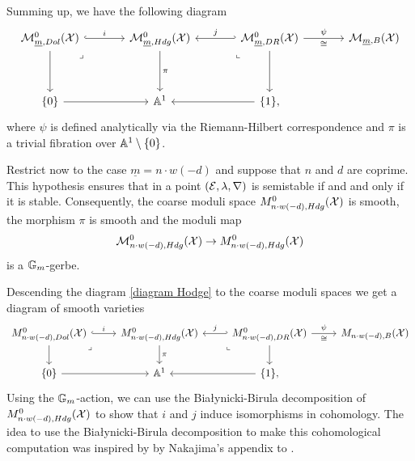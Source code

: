 \documentclass{article}
\begin{document}
Summing up, we have the following diagram
\begin{equation} \label{diagram Hodge}
    \begin{tikzcd}[ampersand replacement=\&, column sep=large, row sep=huge]
        {\mc{M}_{\underline{m}, Dol}^0(\XX)} \& {\mc{M}_{\underline{m},Hdg}^0(\XX)} \& {\mc{M}_{\underline{m}, DR}^0(\XX)} \& {\mc{M}_{\underline{m},B}(\XX)} \\
        {\{ 0 \}} \& {\Ab^1} \& {\{ 1 \},}
        \arrow["i", hook, from=1-1, to=1-2]
        \arrow[from=1-1, to=2-1]
        \arrow["\lrcorner"{anchor=center, pos=0.125}, draw=none, from=1-1, to=2-2]
        \arrow["\pi", from=1-2, to=2-2]
        \arrow["j"', hook', from=1-3, to=1-2]
        \arrow["\psi", "\cong"', from=1-3, to=1-4]
        \arrow["\lrcorner"{anchor=center, pos=0.125, rotate=-90}, draw=none, from=1-3, to=2-2]
        \arrow[from=1-3, to=2-3]
        \arrow[from=2-1, to=2-2]
        \arrow[from=2-3, to=2-2]
    \end{tikzcd}
\end{equation}
where $\psi$ is defined analytically via the Riemann-Hilbert correspondence and $\pi$ is a trivial fibration over $\mathbb{A}^1 \setminus \{0\}$.

Restrict now to the case $\underline{m} = n \cdot w(-d)$ and suppose that $n$ and $d$ are coprime. This hypothesis ensures that in a point $(\mathcal{E}, \lambda, \nabla)$ is semistable if and and only if it is stable. Consequently, the coarse moduli space $M_{n \cdot w(-d), Hdg}^0(\mathcal{X})$ is smooth, the morphism $\pi$ is smooth and the moduli map
\begin{equation}
\mathcal{M}_{n \cdot w(-d), Hdg}^0(\mathcal{X}) \to M_{n \cdot w(-d), Hdg}^0(\mathcal{X})
\end{equation}
is a $\mathbb{G}_m$-gerbe.

Descending the diagram \eqref{diagram Hodge} to the coarse moduli spaces we get a diagram of smooth varieties
\begin{equation}
\begin{tikzcd}
	{M_{n \cdot w(-d), Dol}^0(\XX)} & {M_{n \cdot w(-d), Hdg}^{0}(\XX)} & {M_{n \cdot w(-d), DR}^0(\XX)} & {M_{n \cdot w(-d), B}(\XX)} \\
	{\{ 0 \}} & {\Ab^1} & {\{ 1 \},}
	\arrow["i", hook, from=1-1, to=1-2]
	\arrow[from=1-1, to=2-1]
	\arrow["\lrcorner"{anchor=center, pos=0.125}, draw=none, from=1-1, to=2-2]
	\arrow["\pi", from=1-2, to=2-2]
	\arrow["j"', hook', from=1-3, to=1-2]
	\arrow["\psi", "\cong"', from=1-3, to=1-4]
	\arrow["\lrcorner"{anchor=center, pos=0.125, rotate=-90}, draw=none, from=1-3, to=2-2]
	\arrow[from=1-3, to=2-3]
	\arrow[from=2-1, to=2-2]
	\arrow[from=2-3, to=2-2]
\end{tikzcd}
\end{equation}
Using the $\mathbb{G}_m$-action, we can use the Bia\l{y}nicki-Birula decomposition of $M_{n \cdot w(-d), Hdg}^{0}(\mathcal{X})$ to show that $i$ and $j$ induce isomorphisms in cohomology. The idea to use the Bia\l{y}nicki-Birula decomposition to make this cohomological computation was inspired by by Nakajima's appendix to \cite{appendix-by-nakajima}.
\end{document}
